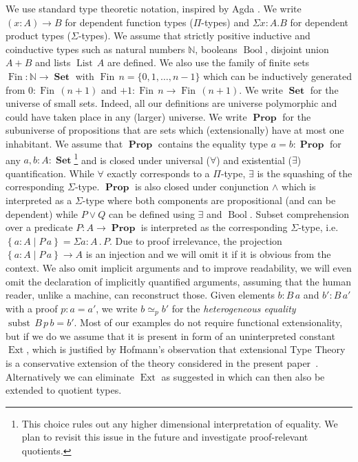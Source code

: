 \documentclass[envcountsame]{llncs}
\newcommand{\N}{\mathbb{N}}
\newcommand{\dotop}{\mathrel{.}}
\providecommand{\set}  [1]{\left\{#1\right\}}
\DeclareMathOperator{\Prop}{\mathbf{Prop}}
\DeclareMathOperator{\Set}{\mathbf{Set}}
\DeclareMathOperator{\Ext}{Ext}
\DeclareMathOperator{\Bool}{Bool}
\DeclareMathOperator{\subst}{subst}
\DeclareMathOperator{\List}{List}
\DeclareMathOperator{\Fin}{Fin}
\renewcommand{\equiv}{=}
\begin{document}
We use standard type theoretic notation, inspired by Agda
\cite{norell-phd}. We write $(x : A) \to B$ for dependent function
types ($\Pi$-types) and $\Sigma x:A.B$ for dependent product types
($\Sigma$-types). We assume that strictly positive inductive and
coinductive types such as natural numbers $\N$, booleans $\Bool$,
disjoint union $A + B$ and lists $\List\,A$ are defined. We also use
the family of finite sets $\Fin : \N \to \Set$ with $\Fin\,n = \{ 0 ,
1, \dots, n-1\}$ which can be inductively generated from $0 :
\Fin\,(n+1)$ and $+1 : \Fin\,n \to \Fin\,(n+1) $. We write $\Set$ for
the universe of small sets. Indeed, all our definitions are universe
polymorphic and could have taken place in any (larger) universe.  We
write $\Prop$ for the subuniverse of propositions that are sets which
(extensionally) have at most one inhabitant. We assume that $\Prop$
contains the equality type $a = b : \Prop$ for any $a,b : A : \Set$\footnote{This choice rules out any higher dimensional interpretation
of equality. We plan to revisit this issue in the future and
investigate proof-relevant quotients.}  and is closed under
universal ($\forall$) and existential ($\exists$)
quantification. While $\forall$ exactly corresponds to a $\Pi$-type,
$\exists$ is the squashing \cite{mendler1990quotient} of the
corresponding $\Sigma$-type.  $\Prop$ is also closed under conjunction
$\wedge$ which is interpreted as a $\Sigma$-type where both components
are propositional (and can be dependent) while $P \vee Q$ can be
defined using $\exists$ and $\Bool$.  Subset comprehension over a
predicate $P : A \to \Prop$  is interpreted as the corresponding $\Sigma$-type,
i.e. $\set{a:A\mid P\,a}=\Sigma a:A \dotop P$. Due to proof
irrelevance, the projection $\set{a:A\mid P\,a} \to A$ is an injection
and we will omit it if it is obvious from the context. We also omit
implicit arguments and to improve readability, we will even omit the
declaration of implicitly quantified arguments, assuming that the
human reader, unlike a machine, can reconstruct those. Given elements $b : B\,a$ and $b' : B\,a'$ with a proof $p : a = a'$,
we write $b \simeq_{p} b'$ for  the \emph{heterogeneous equality} $\subst\,B\,p\,b \equiv b'$. Most of
our examples do not require functional extensionality, but if we do we
assume that it is present in form of an uninterpreted constant $\Ext$,
which is justified by Hofmann's observation that extensional Type
Theory is a conservative extension of the theory considered in the present paper~\cite{hofmann1995thesis}. Alternatively we can eliminate $\Ext$ as suggested in
\cite{alti:lics99} which can then also be extended to quotient types.
\end{document}
